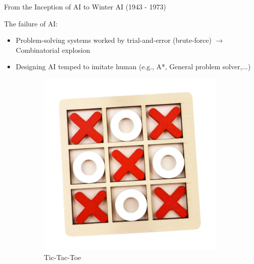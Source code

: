 \begin{frame}{From the Inception of AI to Winter AI (1943 - 1973)}

    The failure of AI:
    \begin{itemize}
        \item Problem-solving systems worked by trial-and-error (brute-force) $\to$ Combinatorial explosion
        \item Designing AI temped to imitate human (e.g., A*, General problem solver,...)
    \end{itemize}

    \begin{figure}
        \centering
        \begin{subfigure}[b]{0.25\textwidth}            
            \centering
            \includegraphics[width=\textwidth]{img/tic_tac_toe.png}
            \caption{Tic-Tac-Toe}
        \end{subfigure}%
        \begin{subfigure}[b]{0.25\textwidth}
            \centering

\end{subfigure}
\end{figure}
\end{frame}
